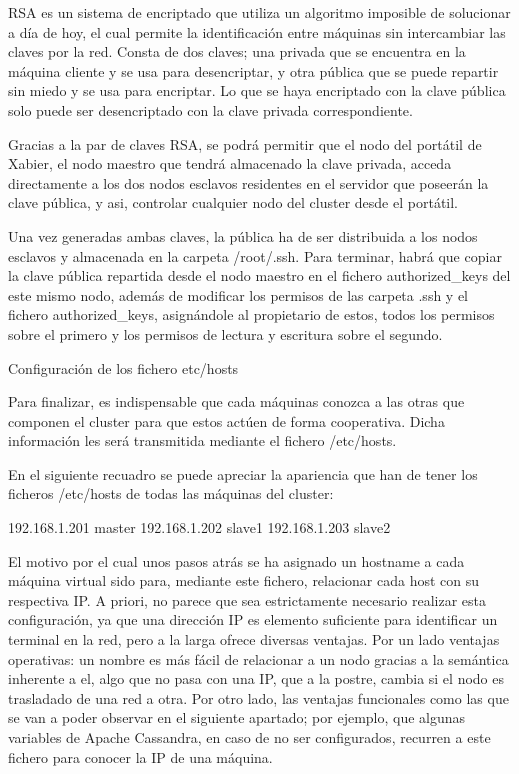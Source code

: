 RSA es un sistema de encriptado que utiliza un algoritmo imposible de solucionar a día de hoy, el cual permite la identificación entre máquinas sin intercambiar las claves por la red. Consta de dos claves; una privada que se encuentra en la máquina cliente y se usa para desencriptar, y otra pública que se puede repartir sin miedo y se usa para encriptar. Lo que se haya encriptado con la clave pública solo puede ser desencriptado con la clave privada correspondiente.

Gracias a la par de claves RSA, se podrá permitir que el nodo del portátil de Xabier, el nodo maestro que tendrá almacenado la clave privada, acceda directamente a los dos nodos esclavos residentes en el servidor que poseerán la clave pública, y asi, controlar cualquier nodo del cluster desde el portátil.

Una vez generadas ambas claves, la pública ha de ser distribuida a los nodos esclavos y almacenada en la carpeta /root/.ssh. Para terminar,  habrá que copiar la clave pública repartida desde el nodo maestro en el fichero authorized_keys del este mismo nodo, además de modificar los permisos de las carpeta .ssh y el fichero authorized_keys, asignándole al propietario de estos, todos los permisos sobre el primero y  los permisos de lectura y escritura sobre el segundo.

Configuración de los fichero etc/hosts

Para finalizar, es indispensable que cada máquinas conozca a las otras que componen el cluster para que estos actúen de forma  cooperativa. Dicha información les será transmitida mediante el fichero /etc/hosts.

En el siguiente recuadro se puede apreciar la apariencia que han de tener los ficheros /etc/hosts de todas las máquinas del cluster:

192.168.1.201 master
192.168.1.202 slave1
192.168.1.203 slave2

El motivo por el cual unos pasos atrás se ha asignado un hostname a cada máquina virtual sido para, mediante este fichero, relacionar cada host con su respectiva IP. A priori, no parece que sea estrictamente necesario realizar esta configuración, ya que una dirección IP es elemento suficiente para identificar un terminal en la red, pero a la larga ofrece diversas ventajas. Por un lado  ventajas operativas: un nombre es más fácil de relacionar a un nodo gracias a la semántica inherente a el, algo que no pasa con una IP, que a la postre, cambia si el nodo es trasladado de una red a otra. Por otro lado, las ventajas funcionales como las que se van a poder observar en el siguiente apartado; por ejemplo, que algunas variables de Apache Cassandra, en caso de no ser configurados, recurren a este fichero para conocer la IP de una máquina.  

